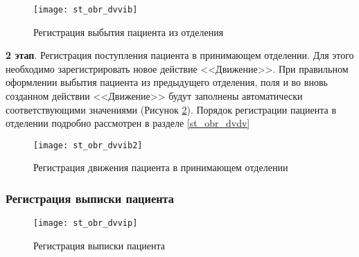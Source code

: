 \begin{figure}[ht]\centering
   \texttt{[image: st\_obr\_dvvib]}
   \caption{Регистрация выбытия пациента из отделения}
   \label{img_st_obr_dvvib}
 \end{figure}
 
\textbf{2 этап}. Регистрация поступления пациента в принимающем отделении. Для этого необходимо зарегистрировать новое действие <<Движение>>. При правильном оформлении выбытия пациента из предыдущего отделения, поля  и  во вновь созданном действии <<Движение>> будут заполнены автоматически соответствующими значениями (Рисунок \ref{img_st_obr_dvvib2}). Порядок регистрации пациента в отделении подробно рассмотрен в разделе \ref{st_obr_dvdv}

\begin{figure}[ht]\centering
   \texttt{[image: st\_obr\_dvvib2]}
   \caption{Регистрация движения пациента в принимающем отделении}
   \label{img_st_obr_dvvib2}
\end{figure}

\subsubsection{Регистрация выписки пациента}

\begin{figure}[ht]\centering
   \texttt{[image: st\_obr\_dvvip]}
   \caption{Регистрация выписки пациента}
   \label{img_st_obr_dvvip}
\end{figure}

